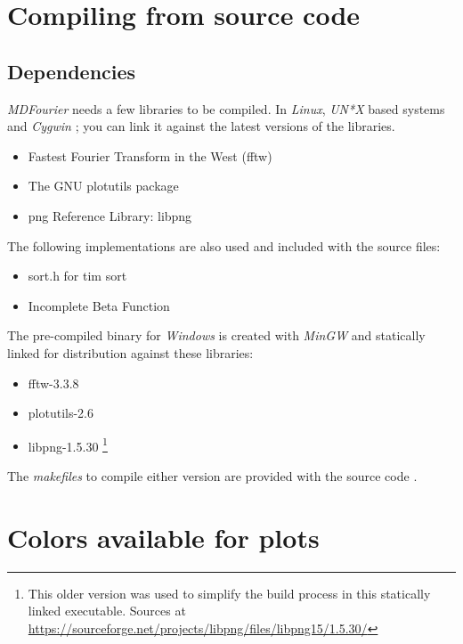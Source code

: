\documentclass[10pt,a4paper]{report}
\begin{document}
\begin{appendices}
\chapter{Compiling from source code}

\section{Dependencies}

\textit{MDFourier} needs a few libraries to be compiled. In \textit{Linux}, \textit{UN*X} based systems and \textit{Cygwin} \cite{cygwin}; you can link it against the latest versions of the libraries. 

\begin{itemize}
	\item Fastest Fourier Transform in the West (fftw) \cite{fftw}
	\item The GNU plotutils package \cite{libplot}
	\item \acrshort{png} Reference Library: libpng \cite{libpng}
\end{itemize}

The following implementations are also used and included with the source files:

\begin{itemize}
	\item sort.h for tim sort \cite{sort}
	\item Incomplete Beta Function \cite{betafunction}
\end{itemize}

The pre-compiled binary for \textit{Windows} is created with \textit{MinGW}\cite{mingw} and statically linked for distribution against these libraries:

\begin{itemize}
	\item fftw-3.3.8 \cite{fftw}
	\item plotutils-2.6 \cite{libplot}
	\item libpng-1.5.30 \footnote{This older version was used to simplify the build process in this statically linked executable. Sources at \url{https://sourceforge.net/projects/libpng/files/libpng15/1.5.30/}}
\end{itemize}

The \textit{makefiles} to compile either version are provided with the source code \cite{sourcecode}.

\chapter{Colors available for plots}
\label{availablecolors}


\end{appendices}
\end{document}
